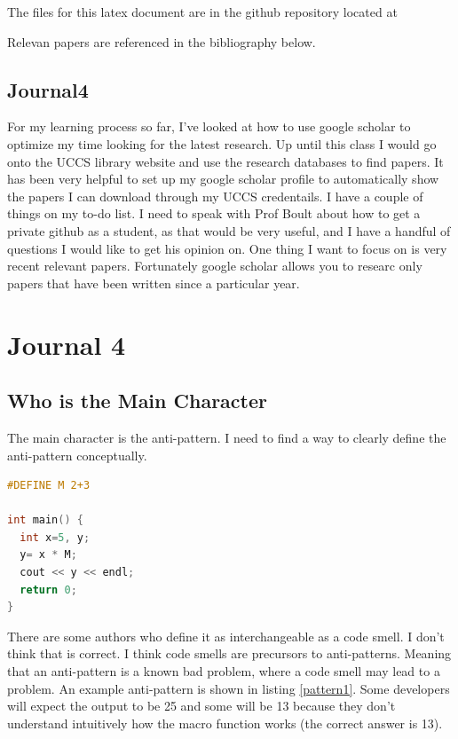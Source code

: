 \documentclass[conference]{IEEEtran}
\begin{document}
The files for this latex document are in the github repository located at 

Relevan papers are referenced in the bibliography below. 

\subsection{Journal4}
For my learning process so far, I've looked at how to use google scholar to optimize my time looking for the latest research.
Up until this class I would go onto the UCCS library website and use the research databases to find papers. 
It has been very helpful to set up my google scholar profile to automatically show the papers I can download through my UCCS credentails.
I have a couple of things on my to-do list.
I need to speak with Prof Boult about how to get a private github as a student, as that would be very useful, and I have a handful of questions I would like to get his opinion on. 
One thing I want to focus on is very recent relevant papers.
Fortunately google scholar allows you to researc only papers that have been written since a particular year.

\section{Journal 4}
\subsection{Who is the Main Character}
The main character is the anti-pattern. I need to find a way to clearly define the anti-pattern conceptually. 

\begin{lstlisting}[language=C,frame=single,caption=Example Anti-Pattern,label=pattern1]
#DEFINE M 2+3

int main() {
  int x=5, y;
  y= x * M;
  cout << y << endl;
  return 0;
}
\end{lstlisting}

There are some authors who define it as interchangeable as a code smell. 
I don't think that is correct. 
I think code smells are precursors to anti-patterns. 
Meaning that an anti-pattern is a known bad problem, where a code smell may lead to a problem.
An example anti-pattern is shown in listing \ref{pattern1}. Some developers will expect the output to be 25 and some will be 13 because they don't understand intuitively how the macro function works (the correct answer is 13).
\end{document}
